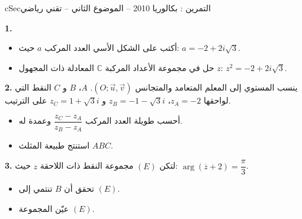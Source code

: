\documentclass[12pt,a4paper]{article}
\newenvironment{BOX}[2]{\begin{otherlanguage}{english}\begin{arbox}{#1}{#2}}{\end{arbox}\end{otherlanguage}}
\newcounter{exo}
\newenvironment{tamrin}[1]{\stepcounter{exo}\begin{BOX}{cSec}{التمرين \theexo: #1}}{\end{BOX}}
\newenvironment{sq}{\begin{itemize}[leftmargin=2.4em,itemsep=3pt]}{\end{itemize}}
\newcommand{\qa}{\item[(أ)]}\newcommand{\qb}{\item[(ب)]}\newcommand{\qc}{\item[(جـ)]}\newcommand{\qd}{\item[(د)]}\newcommand{\qe}{\item[(هـ)]}
\newcommand{\QQ}[1]{\par\smallskip\textbf{#1.} }
\begin{document}
\begin{tamrin}{بكالوريا 2010 -- الموضوع الثاني -- تقني رياضي}
\QQ{1}
\begin{sq}
\qa أكتب على الشكل الأسي العدد المركب $a$ حيث: $a=-2+2i\sqrt3$.
\qb حل في مجموعة الأعداد المركبة $\mathbb{C}$ المعادلة ذات المجهول $z$: $z^2=-2+2i\sqrt3$.
\end{sq}
\QQ{2} ينسب المستوي إلى المعلم المتعامد والمتجانس $(O;\vec u,\vec v)$.
$A$، $B$ و $C$ النقط التي لواحقها $z_A=-2$، $z_B=-1-\sqrt3 i$ و $z_C=1+\sqrt3 i$ على الترتيب.
\begin{sq}
\qa أحسب طويلة العدد المركب $\dfrac{z_C-z_A}{z_B-z_A}$ وعمدة له.
\qb استنتج طبيعة المثلث $ABC$.
\end{sq}
\QQ{3} لتكن $(E)$ مجموعة النقط ذات اللاحقة $z$ حيث: $\arg(\overline{z}+2)=\dfrac{\pi}{3}$.
\begin{sq}
\qa تحقق أن $B$ تنتمي إلى $(E)$.
\qb عيّن المجموعة $(E)$.
\end{sq}
\end{tamrin}
\end{document}
